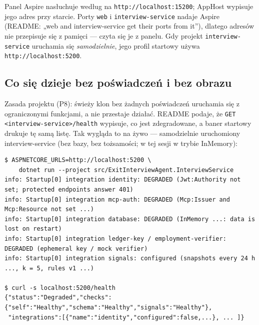 {Panel Aspire nasłuchuje według  na
\texttt{http:\allowbreak{}/\allowbreak{}/\allowbreak{}localhost:\allowbreak{}15200}; AppHost wypisuje jego adres przy starcie.
Porty \texttt{web} i \texttt{interview-\allowbreak{}service} nadaje Aspire (README: „web and
interview-service get their ports from it”), dlatego adresów nie przepisuje
się z pamięci --- czyta się je z panelu. Gdy projekt \texttt{interview-\allowbreak{}service}
uruchamia się \emph{samodzielnie}, jego profil startowy używa
\texttt{http:\allowbreak{}/\allowbreak{}/\allowbreak{}localhost:\allowbreak{}5200}.


\subsection{Co się dzieje bez poświadczeń i bez obrazu}

Zasada projektu (P8): świeży klon bez żadnych poświadczeń uruchamia się z
ograniczonymi funkcjami, a nie przestaje działać. README podaje, że
\texttt{GET <interview-\allowbreak{}service>/\allowbreak{}health} wypisuje, co jest zdegradowane, a
baner startowy drukuje tę samą listę. Tak wygląda to na żywo --- samodzielnie
uruchomiony interview-service (bez bazy, bez tożsamości; w tej sesji w trybie
InMemory):

\begin{Verbatim}[fontsize=\scriptsize,frame=single,framesep=2mm]
$ ASPNETCORE_URLS=http://localhost:5200 \
    dotnet run --project src/ExitInterviewAgent.InterviewService
info: Startup[0] integration identity: DEGRADED (Jwt:Authority not set; protected endpoints answer 401)
info: Startup[0] integration mcp-auth: DEGRADED (Mcp:Issuer and Mcp:Resource not set ...)
info: Startup[0] integration database: DEGRADED (InMemory ...: data is lost on restart)
info: Startup[0] integration ledger-key / employment-verifier: DEGRADED (ephemeral key / mock verifier)
info: Startup[0] integration signals: configured (snapshots every 24 h ..., k = 5, rules v1 ...)

$ curl -s localhost:5200/health
{"status":"Degraded","checks":{"self":"Healthy","schema":"Healthy","signals":"Healthy"},
 "integrations":[{"name":"identity","configured":false,...}, ... ]}
\end{Verbatim}

}
